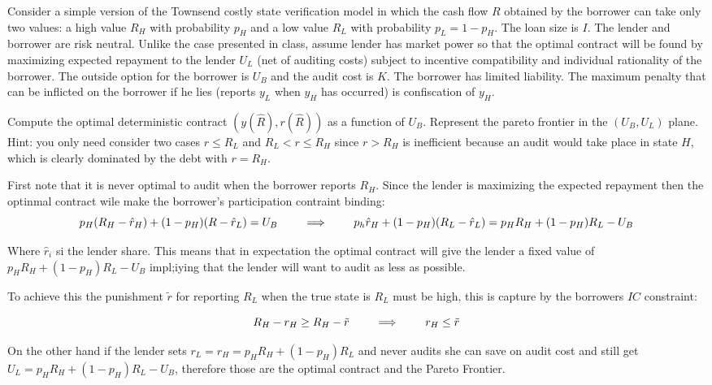 \documentclass[12pt]{article}
\begin{document}
\begin{exercise}
    Consider a simple version of the Townsend costly state verification model in which the cash flow $R$ obtained by the borrower can take only two values: a high value $R_{H}$ with probability $p_H$ and a low value $R_{L}$ with probability $p_L=1-p_H$. The loan size is $I$. The lender and borrower are risk neutral. Unlike the case presented in class, assume lender has market power so that the optimal contract will be found by maximizing expected repayment to the lender $U_{L}$ (net of auditing costs) subject to incentive compatibility and individual rationality of the borrower. The outside option for the borrower is $U_{B}$ and the audit cost is $K$. The borrower has limited liability. The maximum penalty that can be inflicted on the borrower if he lies (reports $y_{L}$ when $y_{H}$ has occurred) is confiscation of $y_{H}$.
\end{exercise}
\begin{subexercise}
    Compute the optimal deterministic contract $(y(\widehat{R}), r(\widehat{R}))$ as a function of $U_{B}$. Represent the pareto frontier in the $\left(U_{B}, U_{L}\right)$ plane. Hint: you only need consider two cases $r \leq R_{L}$ and $R_{L}<r \leq R_{H}$ since $r>R_{H}$ is inefficient because an audit would take place in state $H$, which is clearly dominated by the debt with $r=R_{H}$.
\end{subexercise}
\begin{answer}
    First note that it is never optimal to audit when the borrower reports $R_{H}$. Since the lender is maximizing the expected repayment then the optinmal contract wile make the borrower's participation contraint binding:
    $$p_H(R_H-\hat{r}_H) + (1-p_H)(R - \hat{r}_L) = U_{B} \qquad \implies \qquad  p_h \hat{r}_H + (1-p_H)(R_L - \hat{r}_L) =p_H R_H + (1-p_H)R_L - U_{B}$$

    Where $\hat{r}_i$ si the lender share. This means that in expectation the optimal contract will give the lender a fixed value of $p_H R_H + (1-p_H)R_L - U_{B}$ impl;iying that the lender will want to audit as less as possible.

    To achieve this the punishment $\tilde{r}$ for reporting $R_L$ when the true state is $R_L$ must be high, this is capture by the borrowers $IC$ constraint:

    $$ R_H - r_H \geq R_H - \tilde{r} \qquad \implies \qquad r_H \leq \tilde{r}$$

    On the other hand if the lender sets $r_L = r_H = p_H R_H + (1-p_H)R_L$ and never audits she can save on audit cost and still get $U_L = p_H R_H + (1-p_H)R_L - U_{B}$, therefore those are the optimal contract and the Pareto Frontier.


\end{answer}
\end{document}
